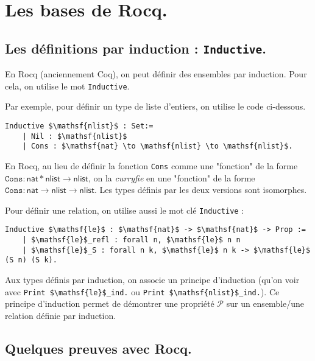 \documentclass[../main]{subfiles}
\begin{document}
  \chapter{Les bases de Rocq.} \label{thprog-chap03} {
  \lstset{language=Coq}
  \section{Les définitions par induction : \lstinline|Inductive|.}

  En Rocq (anciennement Coq), on peut définir des ensembles par induction.
  Pour cela, on utilise le mot \lstinline|Inductive|.

  Par exemple, pour définir un type de liste d'entiers, on utilise le code ci-dessous.

  \begin{lstlisting}[caption=Définition du type $\mathsf{nlist}$ en Rocq]
    Inductive $\mathsf{nlist}$ : Set:=
    | Nil : $\mathsf{nlist}$
    | Cons : $\mathsf{nat} \to \mathsf{nlist} \to \mathsf{nlist}$.
  \end{lstlisting}

  En Rocq, au lieu de définir la fonction \texttt{Cons} comme une "fonction" de la forme $\mathtt{Cons} : \mathsf{nat} * \mathsf{nlist} \to \mathsf{nlist}$, on la \textit{curryfie} en une "fonction" de la forme $\mathtt{Cons} : \mathsf{nat} \to \mathsf{nlist} \to \mathsf{nlist}$. Les types définis par les deux versions sont isomorphes.


  Pour définir une relation, on utilise aussi le mot clé \lstinline|Inductive| :

  \begin{lstlisting}[caption=Définition de la relation $\mathsf{le}$]
    Inductive $\mathsf{le}$ : $\mathsf{nat}$ -> $\mathsf{nat}$ -> Prop :=
    | $\mathsf{le}$_refl : forall n, $\mathsf{le}$ n n
    | $\mathsf{le}$_S : forall n k, $\mathsf{le}$ n k -> $\mathsf{le}$ (S n) (S k).
  \end{lstlisting}

  Aux types définis par induction, on associe un principe d'induction (qu'on voir avec \lstinline|Print $\mathsf{le}$_ind.| ou   \lstinline|Print $\mathsf{nlist}$_ind.|).
  Ce principe d'induction permet de démontrer une propriété $\mathcal{P}$ sur un ensemble/une relation définie par induction.

  \section{Quelques preuves avec Rocq.}

}
\end{document}
